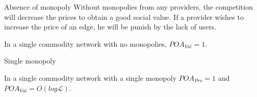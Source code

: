\documentclass{beamer}
\begin{document}
\begin{frame}{Absence of monopoly}
  Without monopolies from any providers, the competition will decrease the prices to obtain a good social value. If a provider wishes to increase the price of an edge, he will be punish by the lack of users.
  \begin{theorem}
    In a single commodity network with no monopolies, \(POA_{Val} = 1\).%
  \end{theorem}
  \center
\end{frame}

\begin{frame}{Single monopoly}
  \begin{theorem}
    In a single commodity network with a single monopoly \(POA_{Pro} = 1\) and \(POA_{Val} = O(log \mathcal{L})\).
  \end{theorem}
  \center
\end{frame}
\end{document}
